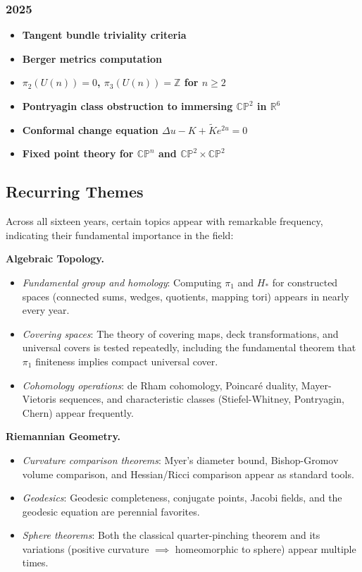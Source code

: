 \subsubsection*{2025}
\begin{itemize}
    \item \textbf{Tangent bundle triviality criteria}
    \item \textbf{Berger metrics computation}
    \item \textbf{$\pi_2(U(n)) = 0$, $\pi_3(U(n)) = \mathbb{Z}$ for $n \geq 2$}
    \item \textbf{Pontryagin class obstruction to immersing $\mathbb{CP}^2$ in $\mathbb{R}^6$}
    \item \textbf{Conformal change equation $\Delta u - K + \widetilde{K}e^{2u} = 0$}
    \item \textbf{Fixed point theory for $\mathbb{CP}^n$ and $\mathbb{CP}^2 \times \mathbb{CP}^2$}
\end{itemize}

\subsection*{Recurring Themes}

Across all sixteen years, certain topics appear with remarkable frequency, indicating their fundamental
importance in the field:

\medskip\noindent\textbf{Algebraic Topology.}
\begin{itemize}
    \item \textit{Fundamental group and homology}: Computing $\pi_1$ and $H_*$ for constructed spaces
          (connected sums, wedges, quotients, mapping tori) appears in nearly every year.
    \item \textit{Covering spaces}: The theory of covering maps, deck transformations, and universal covers
          is tested repeatedly, including the fundamental theorem that $\pi_1$ finiteness implies compact
          universal cover.
    \item \textit{Cohomology operations}: de Rham cohomology, Poincar\'e duality, Mayer-Vietoris sequences,
          and characteristic classes (Stiefel-Whitney, Pontryagin, Chern) appear frequently.
\end{itemize}

\medskip\noindent\textbf{Riemannian Geometry.}
\begin{itemize}
    \item \textit{Curvature comparison theorems}: Myer's diameter bound, Bishop-Gromov volume comparison,
          and Hessian/Ricci comparison appear as standard tools.
    \item \textit{Geodesics}: Geodesic completeness, conjugate points, Jacobi fields, and the geodesic
          equation are perennial favorites.
    \item \textit{Sphere theorems}: Both the classical quarter-pinching theorem and its variations
          (positive curvature $\implies$ homeomorphic to sphere) appear multiple times.
\end{itemize}

